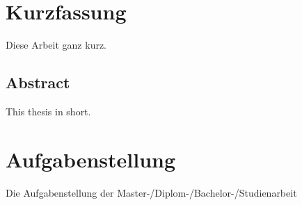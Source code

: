 
\chapter*{Kurzfassung}

Diese Arbeit ganz kurz.

%
\vskip 3cm
%

\section*{\huge Abstract}

This thesis in short.

\thispagestyle{empty}
\cleardoublepage


\chapter*{Aufgabenstellung}

Die Aufgabenstellung der Master-/Diplom-/Bachelor-/Studienarbeit
